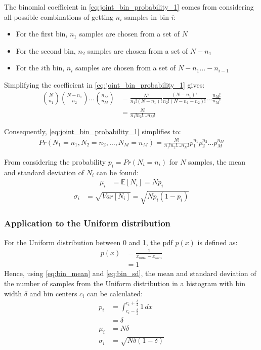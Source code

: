 \documentclass[a4paper]{article}
\begin{document}
The binomial coefficient in \autoref{eq:joint_bin_probability_1} comes from considering all possible combinations of
getting $n_i$ samples in bin $i$:
\begin{itemize}
    \item For the first bin, $n_1$ samples are chosen from a set of $N$
    \item For the second bin, $n_2$ samples are chosen from a set of $N - n_1$
    \item For the $i$th bin, $n_i$ samples are chosen from a set of $N - n_1 \dots - n_{i-1}$
\end{itemize}
Simplifying the coefficient in \autoref{eq:joint_bin_probability_1} gives:
\begin{align*}
    {N \choose n_1}{N - n_1 \choose n_2} \dots {n_M \choose n_M}
  & = \frac{N!}{n_1!(N - n_1)!} \frac{(N - n_1)!}{n_2!(N - n_1 - n_2)!} \dots \frac{n_M!}{n_M!} \\
  & = \frac{N!}{n_1! n_2! \dots n_M!}
\end{align*}

Consequently, \autoref{eq:joint_bin_probability_1} simplifies to:
\begin{align*}
    Pr(N_1 = n_1, N_2 = n_2, \dots, N_M = n_M) = \frac{N!}{n_1! n_2! \dots n_M!} p_1^{n_1} p_2^{n_2} ... p_M^{n_M}
\end{align*}

From considering the probability $p_i = Pr(N_i = n_i)$ for $N$ samples, the mean and standard deviation of $N_i$ can be
found:
\begin{align}
    \label{eq:bin_mean}
    \mu_i &= \mathbb{E}[N_i] = N p_i
\end{align}
\begin{align}
    \label{eq:bin_sd}
    \sigma_i &= \sqrt{Var[N_i]} = \sqrt{N p_i (1 - p_i)}
\end{align}


\subsubsection{Application to the Uniform distribution}
For the Uniform distribution between 0 and 1, the pdf $p(x)$ is defined as:
\begin{align*}
    p(x) &= \frac{1}{x_{max} - x_{min}} \\
         &= 1
\end{align*}
Hence, using \autoref{eq:bin_mean} and \autoref{eq:bin_sd}, the mean and standard deviation of the number of samples
from the Uniform distribution in a histogram with bin width $\delta$ and bin centers $c_i$ can be calculated:
\begin{align*}
    p_i &= \int_{c_i - \frac{\delta}{2}}^{c_i + \frac{\delta}{2}}1\,dx \\
        &= \delta \\
    \mu_i &= N \delta \\
    \sigma_i &= \sqrt{N \delta (1 - \delta)}
\end{align*}
\end{document}
